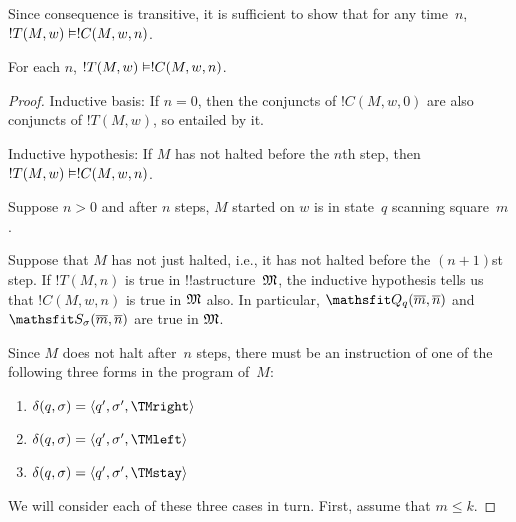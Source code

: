\documentclass[../../../include/open-logic-section]{subfiles}
\begin{document}
Since consequence is transitive, it is sufficient to show that for any
time~$n$, $!T(M, w) \Entails !C(M, w, n)$.

\begin{lem}
For each $n$, $!T(M, w) \Entails !C(M, w, n)$. 
\end{lem}

\begin{proof}
Inductive basis: If $n = 0$, then the conjuncts of $!C(M, w, 0)$ are
also conjuncts of $!T(M, w)$, so entailed by it.

Inductive hypothesis: If $M$ has not halted before the $n$th step,
then $!T(M,w) \Entails !C(M, w, n)$.

Suppose $n > 0$ and after $n$ steps, $M$ started on $w$ is in state~$q$
scanning square~$m$.

Suppose that $M$ has not just halted, i.e., it has not halted before
the $(n+1)$st step. If $!T(M,n)$ is true in !!a{structure}~$\mathfrak M$, the inductive hypothesis tells us that $!C(M, w, n)$ is true in
$\mathfrak M$ also. In particular, $\Obj Q_q(\num{m}, \num{n})$ and
$\Obj S_\sigma(\num{m}, \num{n})$ are true in $\mathfrak M$.

Since $M$ does not halt after~$n$ steps, there must be an instruction
of one of the following three forms in the program of~$M$:

\begin{enumerate} 
\item {} $\delta(q, \sigma) = \tuple{q', \sigma', \TMright}$

\item {} $\delta(q, \sigma) = \tuple{q', \sigma', \TMleft}$

\item {} $\delta(q, \sigma) = \tuple{q', \sigma', \TMstay}$
\end{enumerate}

We will consider each of these three cases in turn.  First, assume
that $m \le k$.


\end{proof}
\end{document}
